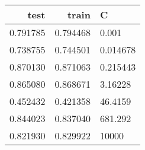 \begin{tabular}{rrl}
\toprule
     test &     train &         C \\
\midrule
 0.791785 &  0.794468 &     0.001 \\
 0.738755 &  0.744501 &  0.014678 \\
 0.870130 &  0.871063 &  0.215443 \\
 0.865080 &  0.868671 &   3.16228 \\
 0.452432 &  0.421358 &   46.4159 \\
 0.844023 &  0.837040 &   681.292 \\
 0.821930 &  0.829922 &     10000 \\
\bottomrule
\end{tabular}
